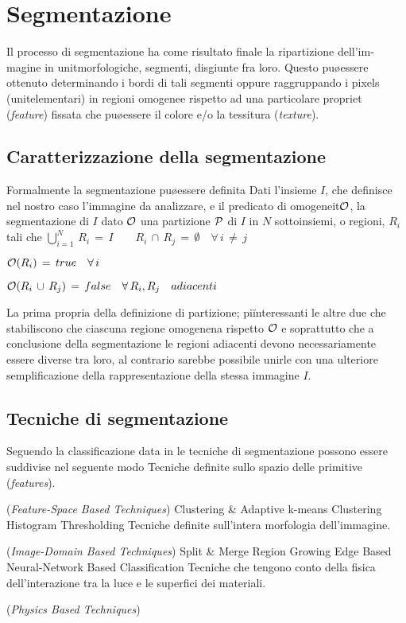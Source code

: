 \chapter{Segmentazione}

Il processo di segmentazione ha come risultato finale la ripartizione dell'im-magine in
unit\a morfologiche, segmenti, disgiunte fra loro.
Questo pu\o essere ottenuto determinando i bordi di tali segmenti oppure raggruppando
i pixels (unit\a elementari) in regioni omogenee rispetto ad una particolare propriet\a
({\it feature}) fissata che pu\o essere il colore e/o la tessitura ({\it texture}).

\section{Caratterizzazione della segmentazione}

Formalmente la segmentazione pu\o essere definita
\bdf
Dati l'insieme $I$, che definisce nel nostro caso l'immagine da analizzare, e il
predicato di omogeneit\a $\cal O$, la segmentazione di $I$ dato $\cal O$ \e una
partizione $\cal P$ di $I$ in $N$ sottoinsiemi, o regioni, $R_i$ tali che
\ben
\im \quad ${\displaystyle \bigcup_{i=1}^{N}\,R_i\,=\,I}
     \qquad R_i\,\cap\,R_j\,=\,\emptyset \quad \forall\,i\,\neq\,j$

\im \quad ${\cal O}(R_i)\,=\,true \quad \forall\,i$

\im \quad ${\cal O}(R_i\,\cup\,R_j)\,=\,false \quad \forall\,R_i,R_j \quad adiacenti$
\een
 
\edf

La prima \e propria della definizione di partizione; pi\u interessanti le altre due
che stabiliscono che ciascuna regione \e omogenena rispetto $\cal O$ e soprattutto
che a conclusione della segmentazione le regioni adiacenti devono necessariamente essere
diverse tra loro, al contrario sarebbe possibile unirle con una
ulteriore semplificazione della rappresentazione della stessa immagine $I$.

\section{Tecniche di segmentazione}

Seguendo la classificazione data in \cite{Lucchese} le tecniche di segmentazione possono
essere suddivise nel seguente modo
\ben
\im Tecniche definite sullo spazio delle primitive ({\it features}).\par
    ({\sl Feature-Space Based Techniques}) 
    \ben
    \im Clustering \& Adaptive k-means Clustering
    \im Histogram Thresholding
    \een
\im Tecniche definite sull'intera morfologia dell'immagine.\par
    ({\sl Image-Domain Based Techniques})
    \ben
    \im Split \& Merge
    \im Region Growing
    \im Edge Based
    \im Neural-Network Based Classification
    \een
\im Tecniche che tengono conto della fisica dell'interazione tra la luce e le 
    superfici dei materiali.\par 
    ({\sl Physics Based Techniques})
\een 

